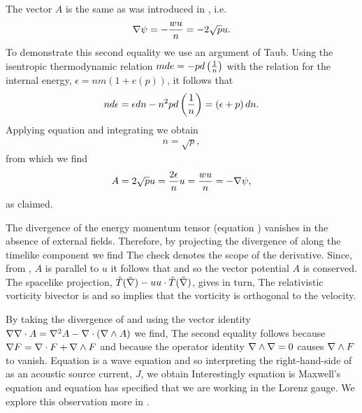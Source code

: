 The vector $A$ is the same as was introduced in ,
i.e.
\begin{align}
  \nabla \psi = - \frac{wu}{n} = - 2\sqrt p u.
\end{align}
To demonstrate this second equality we  use an argument of Taub\cite{Taub1978}.
Using the isentropic thermodynamic relation $m de = - p d\left( \frac{1}{n} \right)$ with the relation for the internal energy, $\epsilon= nm( 1 + e(p))$,
it follows that 
\begin{align}
 n d\epsilon = \epsilon dn - n^2 p d \left( \frac{1}{n} \right) = \left( \epsilon + p \right) dn.
\end{align}
Applying equation  and integrating we obtain
\begin{align}
  n = \sqrt p, \label{eqn:nrootp}
\end{align}
from which we find
\begin{align}
A = 2\sqrt p  u = \frac{2\epsilon}{n} u = \frac{wu}{n} =  - \nabla \psi,
\end{align}
as claimed.


The divergence of the energy momentum tensor (equation ) vanishes in the absence of external fields.
Therefore, by projecting the divergence of  along the timelike component we find
The check denotes the scope of the derivative.
Since, from , $A$ is parallel to $u$  it follows that 
and so the vector potential $A$ is conserved.
The spacelike projection, $\tilde{T}(\tilde{\nabla}) - u u\cdot \tilde{T}(\tilde{\nabla})$, gives in turn,
The relativistic vorticity bivector is 
and so  implies that the vorticity is orthogonal to the velocity.

By taking the divergence of  and using the vector identity
$\nabla \nabla \cdot A = \nabla^2 A - \nabla\cdot\left(  \nabla \wedge A \right) $
 we find,
The second equality follows because $\nabla F = \nabla \cdot F + \nabla \wedge F$ 
and because the  operator identity $\nabla\wedge \nabla = 0$ causes $\nabla \wedge F$ to vanish.
Equation  is a wave equation and so interpreting the right-hand-side of  as an acoustic source current, $J$, we obtain
Interestingly equation  is Maxwell's equation and equation  has specified that we are working in the Lorenz gauge.
We explore this observation more in .


